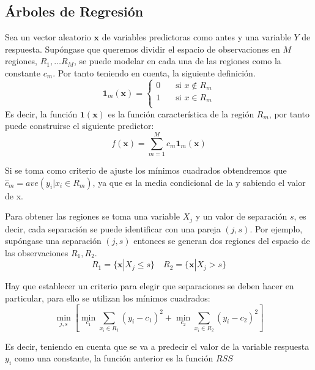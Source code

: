 \subsection{Árboles de Regresión}
\noindent Sea un vector aleatorio $\textbf{x}$ de variables predictoras como antes y una variable $Y$ de respuesta. 
Supóngase que queremos dividir el espacio de observaciones en $M$ regiones, $R_1,\ldots R_M$, se puede modelar en cada una de las regiones como la constante $c_m$. Por tanto teniendo en cuenta, la siguiente definición. 
\begin{equation}
\mathbf{1}_m(\textbf{x})=
\begin{cases}
0\quad& \text{si } x\notin R_m\\
1\quad& \text{si } x\in R_m\\
\end{cases}
\end{equation}
Es decir, la función $\mathbf{1}(\textbf{x})$ es la función característica de la región $R_m$, por tanto puede construirse el siguiente predictor:
\begin{equation}
f(\textbf{x})=\sum_{m=1}^M c_m \mathbf{1}_m(\textbf{x})
\end{equation}

\noindent Si se toma como criterio de ajuste los mínimos cuadrados obtendremos que $\hat{c}_m=ave(y_i|x_i\in R_m)$, ya que es la media condicional de la y sabiendo el valor de x. 

\noindent Para obtener las regiones se toma una variable $X_j$ y un valor de separación $s$, es decir, cada separación se puede identificar con una pareja $(j,s)$. 
Por ejemplo, supóngase una separación $(j,s)$ entonces se generan dos regiones del espacio de las observaciones $R_1, R_2$. 
\begin{equation}
R_1=\lbrace\textbf{x}|X_j\leq s\rbrace\quad R_2=\lbrace\textbf{x}|X_j > s\rbrace 
\end{equation}

\noindent Hay que establecer un criterio para elegir que separaciones se deben hacer en particular, para ello se utilizan los mínimos cuadrados:
\begin{equation}
\min_{j,s}\left[\min_{c_1}\sum_{x_i\in R_1}(y_i-c_1)^2+\min_{c_2}\sum_{x_i\in R_2}(y_i-c_2)^2\right]
\end{equation}

\noindent Es decir, teniendo en cuenta que se va a predecir el valor de la variable respuesta $y_i$ como una constante, la función anterior es la función $RSS$ 

